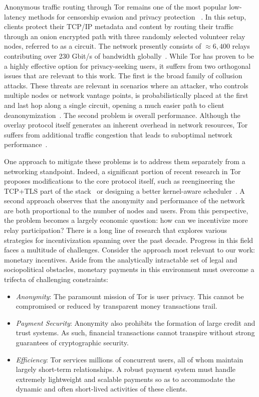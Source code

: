 Anonymous traffic routing through Tor remains one of the most popular
low-latency methods for censorship evasion and privacy protection
~\cite{dingledine2004tor}. In this setup, clients protect their TCP/IP metadata
and content by routing their traffic through an onion encrypted path with three
randomly selected volunteer relay nodes, referred to as a circuit. The network
presently consists of $\approx 6,400$ relays contributing over 230 Gbit/s of
bandwidth globally~\cite{portal2018tormetrics}. While Tor has proven to be a
highly effective option for privacy-seeking users, it suffers from two
orthogonal issues that are relevant to this work. The first is the broad family
of collusion attacks. These threats are relevant in scenarios where an attacker,
who controls multiple nodes or network vantage points, is probabilistically
placed at the first and last hop along a single circuit, opening a much easier
path to client deanonymization~\cite{wright2004predecessor,murdoch2005low}. The
second problem is overall performance. Although the overlay protocol itself
generates an inherent overhead in network resources, Tor suffers from additional
traffic congestion that leads to suboptimal network
performance~\cite{portal2018tormetrics, alsabah2016performance}.

One approach to mitigate these problems is to address them separately from a
networking standpoint. Indeed, a significant portion of recent research in Tor
proposes modifications to the core protocol itself, such as reengineering the
TCP+TLS part of the stack~\cite{reardon2009improving} or designing a better
kernel-aware scheduler~\cite{jansen2014never}. A second approach observes that
the anonymity and performance of the network are both proportional to the number
of nodes and users. From this perspective, the problem becomes a largely
economic question: how can we incentivize more relay participation? There is a
long line of research that explores various strategies for incentivization
spanning over the past decade. Progress in this field faces a multitude of
challenges. Consider the approach most relevant to our work: monetary
incentives. Aside from the analytically intractable set of legal and
sociopolitical obstacles, monetary payments in this environment must overcome a
trifecta of challenging constraints:

\begin{itemize}
\item \emph{Anonymity}: The paramount mission of Tor is user privacy. This
  cannot be compromised or reduced by transparent money transactions trail.
\item \emph{Payment Security}: Anonymity also prohibits the formation of large
  credit and trust systems. As such, financial transactions cannot transpire
  without strong guarantees of cryptographic security.
\item \emph{Efficiency}: Tor services millions of concurrent users, all of whom
  maintain largely short-term relationships. A robust payment system must handle
  extremely lightweight and scalable payments so as to accommodate the dynamic
  and often short-lived activities of these clients.
\end{itemize}

